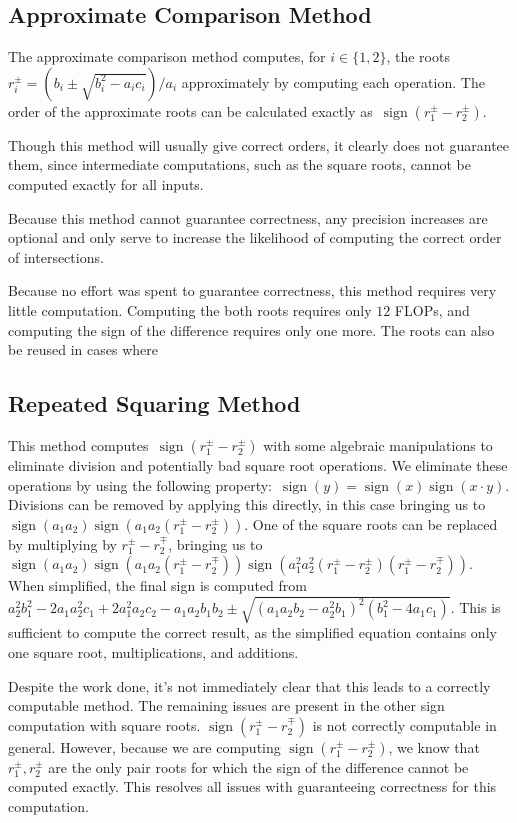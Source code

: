 \documentclass{cccg16}
\DeclareMathOperator{\sign}{sign}
\begin{document}
\subsection{Approximate Comparison Method}
The approximate comparison method computes, for $i\in\{1, 2\}$, the
roots~$r_i^\pm=({b_i\pm\sqrt{b_i^2-a_ic_i}})/{a_i}$ approximately by
computing each operation.  The order of the approximate roots can be
calculated exactly as~$\sign(r_1^\pm-r_2^\pm)$.

Though this method will usually give correct orders, it clearly does
not guarantee them, since intermediate computations, such as the
square roots, cannot be computed exactly for all inputs.

Because this method cannot guarantee correctness, any precision
increases are optional and only serve to increase the likelihood of
computing the correct order of intersections.

Because no effort was spent to guarantee correctness, this method
requires very little computation.  Computing the both roots requires
only $12$ FLOPs, and computing the sign of the difference requires
only one more.  The roots can also be reused in cases where 

\subsection{Repeated Squaring Method}
This method computes~$\sign(r_1^\pm-r_2^\pm)$ with some algebraic
manipulations to eliminate division and potentially bad square root
operations.  We eliminate these operations by using the following
property:~$\sign(y)=\sign(x)\sign(x\cdot y)$.  Divisions can be
removed by applying this directly, in this case bringing us
to~$\sign(a_1 a_2)\sign(a_1 a_2 (r_1^\pm-r_2^\pm))$.  One of the
square roots can be replaced by multiplying by $r_1^\pm-r_2^\mp$,
bringing us to~$\sign(a_1 a_2)\sign(a_1 a_2
(r_1^\pm-r_2^\mp))\sign(a_1^2 a_2^2 (r_1^\pm - r_2^\pm) (r_1^\pm -
r_2^\mp))$.  When simplified, the final sign is computed
from~$a_2^2b_1^2-2a_1a_2^2c_1+2a_1^2a_2c_2-a_1a_2b_1b_2\pm
\sqrt{(a_1a_2b_2-a_2^2b_1)^2(b_1^2-4a_1c_1)}$. This is sufficient to
compute the correct result, as the simplified equation contains only
one square root, multiplications, and additions.

Despite the work done, it's not immediately clear that this leads to a
correctly computable method.  The remaining issues are present in the
other sign computation with square roots. $\sign(r_1^\pm-r_2^\mp)$ is
not correctly computable in general.  However, because we are
computing $\sign(r_1^\pm-r_2^\pm)$, we know that $r_1^\pm, r_2^\pm$
are the only pair roots for which the sign of the difference cannot be
computed exactly.  This resolves all issues with guaranteeing
correctness for this computation.
\end{document}
